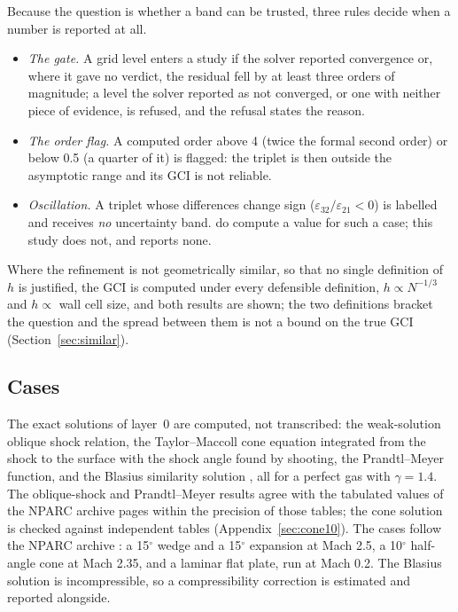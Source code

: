 \documentclass[twocolumn]{labreport}
\begin{document}
Because the question is whether a band can be trusted, three rules decide when a number is reported at all.
\begin{itemize}
\item \emph{The gate.} A grid level enters a study if the solver reported convergence or, where it gave no verdict, the residual fell by at least three orders of magnitude; a level the solver reported as not converged, or one with neither piece of evidence, is refused, and the refusal states the reason.
\item \emph{The order flag.} A computed order above 4 (twice the formal second order) or below 0.5 (a quarter of it) is flagged: the triplet is then outside the asymptotic range and its GCI is not reliable.
\item \emph{Oscillation.} A triplet whose differences change sign ($\varepsilon_{32}/\varepsilon_{21}<0$) is labelled and receives \emph{no} uncertainty band.
  \citet{celik2008} do compute a value for such a case; this study does not, and reports none.
\end{itemize}
Where the refinement is not geometrically similar, so that no single definition of $h$ is justified, the GCI is computed under every defensible definition, $h\propto N^{-1/3}$ and $h\propto$ wall cell size, and both results are shown; the two definitions bracket the question and the spread between them is not a bound on the true GCI (Section~\ref{sec:similar}).

\subsection{Cases}
\label{sec:cases}
\label{sec:exact}
\label{sec:l0setup}
\label{sec:l12setup}

The exact solutions of layer~0 are computed, not transcribed: the weak-solution oblique shock relation, the Taylor--Maccoll cone equation integrated from the shock to the surface with the shock angle found by shooting, the Prandtl--Meyer function, and the Blasius similarity solution \citep{blasius1908,schlichting2017}, all for a perfect gas with $\gamma=1.4$.
The oblique-shock and Prandtl--Meyer results agree with the tabulated values of the NPARC archive pages \citep{nparc_wedge,nparc_pm15} within the precision of those tables; the cone solution is checked against independent tables (Appendix~\ref{sec:cone10}).
The cases follow the NPARC archive \citep{nparc_archive}: a 15$^\circ$ wedge and a 15$^\circ$ expansion at Mach 2.5, a 10$^\circ$ half-angle cone at Mach 2.35, and a laminar flat plate, run at Mach 0.2.
The Blasius solution is incompressible, so a compressibility correction is estimated and reported alongside.
\end{document}
